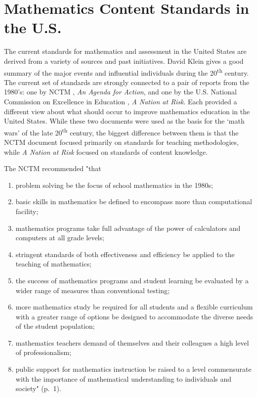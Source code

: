 \documentclass[
]{book}
\theoremstyle{definition}
\theoremstyle{definition}
\theoremstyle{definition}
\theoremstyle{definition}
\theoremstyle{remark}
\begin{document}
\hypertarget{mathematics-content-standards-in-the-u.s.}{%
\section{Mathematics Content Standards in the U.S.}\label{mathematics-content-standards-in-the-u.s.}}

The current standards for mathematics and assessment in the United States are derived from a variety of sources and past initiatives. David Klein \citeyearpar{Klein2003} gives a good summary of the major events and influential individuals during the 20\textsuperscript{th} century. The current set of standards are strongly connected to a pair of reports from the 1980's: one by NCTM \citeyearpar{NCTM1980}, \emph{An Agenda for Action}, and one by the U.S. National Commission on Excellence in Education \citeyearpar{NCEE1983}, \emph{A Nation at Risk}. Each provided a different view about what should occur to improve mathematics education in the United States. While these two documents were used as the basis for the `math wars' of the late 20\textsuperscript{th} century, the biggest difference between them is that the NCTM document focused primarily on standards for teaching methodologies, while \emph{A Nation at Risk} focused on standards of content knowledge.

The NCTM \citeyearpar{NCTM1980} recommended "that

\begin{enumerate}
\def\labelenumi{\arabic{enumi}.}
\item
  problem solving be the focus of school mathematics in the 1980s;
\item
  basic skills in mathematics be defined to encompass more than computational facility;
\item
  mathematics programs take full advantage of the power of calculators and computers at all grade levels;
\item
  stringent standards of both effectiveness and efficiency be applied to the teaching of mathematics;
\item
  the success of mathematics programs and student learning be evaluated by a wider range of measures than conventional testing;
\item
  more mathematics study be required for all students and a flexible curriculum with a greater range of options be designed to accommodate the diverse needs of the student population;
\item
  mathematics teachers demand of themselves and their colleagues a high level of professionalism;
\item
  public support for mathematics instruction be raised to a level commensurate with the importance of mathematical understanding to individuals and society" (p.~1).
\end{enumerate}
\end{document}
